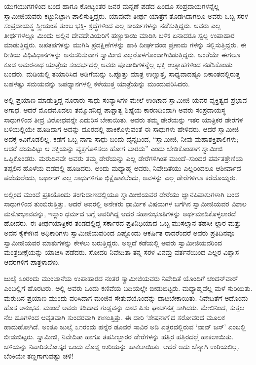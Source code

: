 ಯುಗಯುಗಗಳಿಂದ ಬಂದ ಹಾಗೂ ಕೋಟ್ಯಂತರ ಜನರ ಮನ್ನಣೆ ಪಡೆದ ಹಿಂದೂ ಸಂಪ್ರದಾಯಗಳನ್ನೆಲ್ಲ ಸ್ವಾಮೀಜಿಯವರು ಕಟ್ಟುನಿಟ್ಟಾಗಿ ಪಾಲಿಸುತ್ತಿದ್ದರು. ಯಾವುದೇ ತೀರ್ಥ ಯಾತ್ರೆಗೆ ತೊಡಗಿದಾಗಲೂ ಅವರು ಒಬ್ಬ ಸರಳ ಸಂಪ್ರದಾಯಸ್ಥ ಸ್ತ್ರೀಯಂತೆ ತುಂಬ ಭಕ್ತಿ- ಶ್ರದ್ಧೆಗಳಿಂದ ಎಲ್ಲ ಕಾರ್ಯಗಳನ್ನು ನಡೆಸುತ್ತಿದ್ದರು. ಅವರು ಎಲ್ಲ ತೀರ್ಥಗಳಲ್ಲೂ ಮಿಂದು ಅಲ್ಲಿನ ದೇವದೇವಿಯರಿಗೆ ಹಣ್ಣುಕಾಯಿ ಮಾಡಿಸಿ ಬಳಿಕ ಏನಾದರೂ ಸ್ವಲ್ಪ ಉಪಾಹಾರ ಮಾಡುತ್ತಿದ್ದರು. ಜಪತಪಗಳನ್ನು ಮುಗಿಸಿ ಪ್ರದಕ್ಷಿಣೆಗಳನ್ನು ಹಾಕಿ ದೀರ್ಘದಂಡ ಪ್ರಣಾಮ ಗಳನ್ನು ಸಲ್ಲಿಸುತ್ತಿದ್ದರು. ಈ ರೀತಿಯ ವಿಧಿವಿಧಾನಗಳನ್ನು ಅನುಸರಿಸುವಾಗ ಸ್ವಾಮೀಜಿ ಎಲ್ಲರೊಳಗೊಂದಾಗಿಬಿಡುತ್ತಿದ್ದರು. ಅಂತೆಯೇ ಈಗಲೂ ಕೂಡ ಅಮರನಾಥ ಯಾತ್ರೆಯ ಸಂದರ್ಭದಲ್ಲಿ ಅವರು ಪೂಜಾದಿಗಳನ್ನೆಲ್ಲ ಭಕ್ತಿ ಉತ್ಸಾಹಗಳಿಂದ ನಡೆಸಿಕೊಂಡು ಬಂದರು. ಮಡಿಯಲ್ಲಿ ತಯಾರಿಸಿದ ಅಡಿಗೆಯನ್ನು ಒಪ್ಪೊತ್ತು ಮಾತ್ರ ಉಣ್ಣುತ್ತ, ಸಾಧ್ಯವಾದಷ್ಟೂ ಏಕಾಂತದಲ್ಲಿರುತ್ತ ಬಹಳಷ್ಟು ಸಮಯವನ್ನು ಜಪಧ್ಯಾನಗಳಲ್ಲಿ ಕಳೆಯುತ್ತ ಯಾತ್ರೆಯನ್ನು ಮುಂದುವರಿಸಿದರು.

ಅಲ್ಲಿ ಪ್ರಯಾಣ ಮಾಡುತ್ತಿದ್ದ ನೂರಾರು ಸಾಧು ಸಂನ್ಯಾಸಿಗಳ ಮೇಲೆ ಉಂಟಾದ ಸ್ವಾಮೀಜಿ ಯವರ ವ್ಯಕ್ತಿತ್ವದ ಪ್ರಭಾವ ಅಗಾಧ. ಆದರೆ ಮೊದಮೊದಲು ತಮ್ಮೊಡನಿದ್ದ ಪಾಶ್ಚಾತ್ಯ ಶಿಷ್ಯೆಯ ಕಾರಣದಿಂದಾಗಿ ಅವರು ಸಂಪ್ರದಾಯಸ್ಥ ಸಾಧುಗಳಿಂದ ತೀವ್ರ ವಿರೋಧವನ್ನೇ ಎದುರಿಸ ಬೇಕಾಯಿತು. ಅವರು ತಮ್ಮ ಡೇರೆಯನ್ನು ಇತರ ಯಾತ್ರಿಕರ ಡೇರೆಗಳ ಬಳಿಯಲ್ಲಿಯೇ ಹೂಡಿದಾಗ ಅದನ್ನು ದೂರದಲ್ಲಿ ಹಾಕಿಕೊಳ್ಳುವಂತೆ ಈ ಸಾಧುಗಳು ಹೇಳಿದರು. ಆದರೆ ಸ್ವಾಮೀಜಿ ಅದಕ್ಕೆ ಕಿವಿಗೊಡಲಿಲ್ಲ. ಕಡೆಗೆ ಒಬ್ಬ ನಾಗಾ ಸಾಧು ಬಂದು ದೈನ್ಯದಿಂದ, “ಸ್ವಾಮೀಜಿ, ನೀವು ಮಹಾಶಕ್ತಿಶಾಲಿಗಳು; ಆದರೆ ದಯವಿಟ್ಟು ಆ ಶಕ್ತಿಯನ್ನು ವ್ಯಕ್ತಗೊಳಿಸಲು ಹೋಗ ಬಾರದು” ಎಂದು ಬೇಡಿಕೊಂಡಾಗ ಸ್ವಾಮೀಜಿ ಒಪ್ಪಿಕೊಂಡರು. ಮರುದಿನವೇ ಅವರು ತಮ್ಮ ಡೇರೆಯನ್ನು ಎಲ್ಲ ಡೇರೆಗಳಿಗಿಂತ ಮುಂದೆ–ಸುಂದರ ಪರ್ವತಶ್ರೇಣಿಯ ತಪ್ಪಲಿನ ಹೊಳೆಯ ದಡದಲ್ಲಿ ಹೂಡಿದರು. ಅಂದು ಮಧ್ಯಾಹ್ನ ಅವರು, ನಿವೇದಿತೆಯು ಎಲ್ಲರಿಂದಲೂ ಆಶೀರ್ವಾದ ಪಡೆಯಲೆಂದು, ಅರ್ಥಾತ್ ಎಲ್ಲ ಸಾಧುಗಳಿಗೂ ಭಿಕ್ಷೆಹಾಕಲೆಂದು, ಅವಳನ್ನು ಎಲ್ಲ ಡೇರೆಗಳಿಗೂ ಕರೆದೊಯ್ದರು.

ಅಲ್ಲಿಂದ ಮುಂದೆ ಪ್ರತಿಯೊಂದು ತಂಗುದಾಣದಲ್ಲಿಯೂ ಸ್ವಾಮೀಜಿಯವರ ಡೇರೆಯು ಜ್ಞಾನಪಿಪಾಸುಗಳಾಗಿ ಬಂದ ಸಾಧುಗಳಿಂದ ತುಂಬಿರುತ್ತಿತ್ತು. ಆದರೆ ಅವರಲ್ಲಿ ಅನೇಕರು ಧಾರ್ಮಿಕ ವಿಷಯಗಳ ಬಗೆಗಿನ ಸ್ವಾಮೀಜಿಯವರ ವಿಶಾಲ ಮನೋಭಾವವನ್ನು, ಇಸ್ಲಾಂ ಧರ್ಮದ ಬಗ್ಗೆ ಅವರಿಗಿದ್ದ ಆದರ ಸಹಾನುಭೂತಿಗಳನ್ನು ಅರ್ಥಮಾಡಿಕೊಳ್ಳಲಾರದೆ ಹೋದರು. ಈ ತೀರ್ಥಯಾತ್ರಿಕರ ತಂಡದಲ್ಲಿದ್ದ ಸರ್ಕಾರದ ಪ್ರತಿನಿಧಿಯಾದ ಒಬ್ಬ ಮುಸಲ್ಮಾನ ತಹಸೀ ಲ್ದಾರ ಮತ್ತು ಅವನ ಕೈಕೆಳಗಿನ ಅಧಿಕಾರಿಗಳು ಸ್ವಾಮೀಜಿಯವರಿಂದ ಎಷ್ಟೊಂದು ಆಕರ್ಷಿತ ರಾದರೆಂದರೆ ಅವರು ಪ್ರತಿದಿನವೂ ಸ್ವಾಮೀಜಿಯವರ ಮಾತುಗಳನ್ನು ಕೇಳಲು ಬರುತ್ತಿದ್ದರು. ಅಲ್ಲದೆ ಕಡೆಯಲ್ಲಿ ಅವರು ಸ್ವಾಮೀಜಿಯವರಿಂದ ಮಂತ್ರದೀಕ್ಷೆಯನ್ನು ಯಾಚಿಸಿ ಪಡೆದರು. ಸೋದರಿ ನಿವೇದಿತಾ ತನ್ನ ಸರಳ ವಿನಮ್ರ ವರ್ತನೆಯಿಂದ ಎಲ್ಲರ ವಿಶ್ವಾಸ ಆದರಗಳಿಗೆ ಪಾತ್ರಳಾದಳು.

ಜುಲೈ ೩ಂರಂದು ಮುಂಜಾನೆಯ ಉಪಾಹಾರದ ನಂತರ ಸ್ವಾಮೀಜಿಯವರು ನಿವೇದಿತೆ ಯೊಂದಿಗೆ ಚಂದನ್​ವಾರ್ ಎಂಬಲ್ಲಿಗೆ ಹೊರಟರು. ಅಲ್ಲಿ ಅವರು ಒಂದು ಕಣಿವೆಯ ಬದಿಯಲ್ಲೇ ಬೀಡುಬಿಟ್ಟರು. ಮಧ್ಯಾಹ್ನವೆಲ್ಲ ಮಳೆ ಸುರಿಯಿತು. ಮರುದಿನ ಪ್ರಯಾಣ ಮುಂದು ವರಿಸಿದಾಗ ಮಂಜಿನ ಸೇತುವೆಯೊಂದನ್ನು ದಾಟಬೇಕಾಯಿತು. ನಿವೇದಿತೆಗೆ ಅದೊಂದು ಹೊಸ ಅನುಭವ. ಮುಂದೆ ಅವರು ಕಡಿದಾದ ಗುಡ್ಡವನ್ನು ದಾಟಿ ಪಿಶು ಘಾಟ್​ನತ್ತ ಸಾಗಿದರು. ಮೇಲಿನಿಂದ, ಸುತ್ತಲ ನೆಲ ಹೂಗಳಿಂದ ಆವೃತವಾಗಿ ಸುಂದರವಾಗಿ ಕಾಣುತ್ತಿತ್ತು. ಈ ದಾರಿ ‘ಶೇಷನಾಗ’ದ ಸರೋವರದ ಮೂಲಕ ಹಾದುಹೋಗಿದೆ. ಅಂತೂ ಜುಲೈ ೩೧ರಂದು ಹನ್ನೆರ ಡೂವರೆ ಸಾವಿರ ಅಡಿ ಎತ್ತರದಲ್ಲಿರುವ ‘ವಾವ್ ಜಸ್​’ ಎಂಬಲ್ಲಿ ಬೀಡುಬಿಟ್ಟರು. ಸ್ವಾಮೀಜಿ, ನಿವೇದಿತಾ ಹಾಗೂ ತಹಸೀಲ್ದಾರರ ಡೇರೆಗಳನ್ನು ಹತ್ತಿರ ಹತ್ತಿರದಲ್ಲೆ ಹಾಕಲಾಯಿತು. ಚಳಿಯನ್ನು ನಿವಾರಿಸಲೋಸ್ಕರ ಒಂದು ದೊಡ್ಡ ಉರಿಯನ್ನು ಹಾಕಲಾಯಿತು. ಆದರೆ ಅದು ಚೆನ್ನಾಗಿ ಉರಿಯಲಿಲ್ಲ. ಬೆಂಕಿಯೇ ತಣ್ಣಗಾಗುವಷ್ಟು ಚಳಿ!

